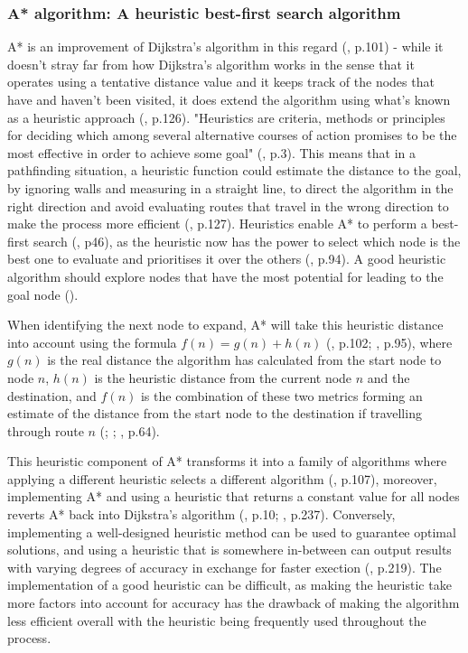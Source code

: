 \documentclass[10pt]{article}
\begin{document}
\subsubsection{A* algorithm: A heuristic best-first search algorithm}

A* is an improvement of Dijkstra's algorithm in this regard (\cite{hart1968formal}, p.101) - while it doesn't stray far from how Dijkstra's algorithm works in the sense that it operates using a tentative distance value and it keeps track of the nodes that have and haven't been visited, it does extend the algorithm using what's known as a heuristic approach (\cite{cui2011based}, p.126). "Heuristics are criteria, methods or principles for deciding which among several alternative courses of action promises to be the most effective in order to achieve some goal" (\cite{pearl1984heuristics}, p.3). This means that in a pathfinding situation, a heuristic function could estimate the distance to the goal, by ignoring walls and measuring in a straight line, to direct the algorithm in the right direction and avoid evaluating routes that travel in the wrong direction to make the process more efficient (\cite{cui2011based}, p.127). Heuristics enable A* to perform a best-first search (\cite{yap2002grid}, p46), as the heuristic now has the power to select which node is the best one to evaluate and prioritises it over the others (\cite{russell2016artificial}, p.94). A good heuristic algorithm should explore nodes that have the most potential for leading to the goal node (\cite{korf1985depth}).

When identifying the next node to expand, A* will take this heuristic distance into account using the formula $f(n) = g(n) + h(n)$ (\cite{hart1968formal}, p.102; \cite{russell2016artificial}, p.95), where $g(n)$ is the real distance the algorithm has calculated from the start node to node $n$, $h(n)$ is the heuristic distance from the current node $n$ and the destination, and $f(n)$ is the combination of these two metrics forming an estimate of the distance from the start node to the destination if travelling through route $n$ (\cite{hart1968formal}; \cite{millington2019ai}; \cite{graham2003pathfinding}, p.64). 

This heuristic component of A* transforms it into a family of algorithms where applying a different heuristic selects a different algorithm (\cite{hart1968formal}, p.107), moreover, implementing A* and using a heuristic that returns a constant value for all nodes reverts A* back into Dijkstra's algorithm (\cite{lester2005pathfinding}, p.10; \cite{millington2019ai}, p.237). Conversely, implementing a well-designed heuristic method can be used to guarantee optimal solutions, and using a heuristic that is somewhere in-between can output results with varying degrees of accuracy in exchange for faster exection (\cite{millington2019ai}, p.219).  The implementation of a good heuristic can be difficult, as making the heuristic take more factors into account for accuracy has the drawback of making the algorithm less efficient overall with the heuristic being frequently used throughout the process.
\end{document}
